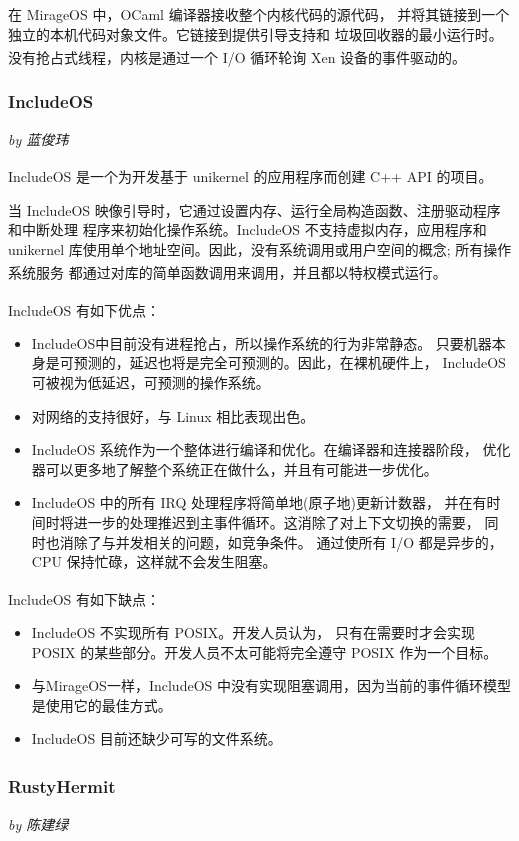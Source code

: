 \documentclass[UTF8,fontset=none,linespread=1.15]{ctexart}
\let\nosupcite\cite
\renewcommand*{\cite}[1]{\textsuperscript{\nosupcite{#1}}}
\newcommand{\sectionauthor}[1]{%
\vspace*{-5ex}
\noindent\textrm{\hfill\textit{by #1}}
\vspace*{2ex}\par}
\begin{document}
在 MirageOS 中，OCaml 编译器接收整个内核代码的源代码，
并将其链接到一个独立的本机代码对象文件。它链接到提供引导支持和
垃圾回收器的最小运行时。没有抢占式线程，内核是通过一个 I/O 循环轮询
Xen 设备的事件驱动的。\cite{bib:11-unikerel2}

\subsubsection{IncludeOS}\sectionauthor{蓝俊玮}

IncludeOS 是一个为开发基于 unikernel 的应用程序而创建 C++ API 的项目。\cite{bib:9-includeos}

当 IncludeOS 映像引导时，它通过设置内存、运行全局构造函数、注册驱动程序和中断处理
程序来初始化操作系统。IncludeOS 不支持虚拟内存，应用程序和
 unikernel 库使用单个地址空间。因此，没有系统调用或用户空间的概念; 所有操作系统服务
 都通过对库的简单函数调用来调用，并且都以特权模式运行。\cite{bib:10-includeos2}

\noindent IncludeOS 有如下优点：\cite{bib:9-includeos}
\begin{itemize}
\item IncludeOS中目前没有进程抢占，所以操作系统的行为非常静态。
只要机器本身是可预测的，延迟也将是完全可预测的。因此，在裸机硬件上，
IncludeOS可被视为低延迟，可预测的操作系统。
\item 对网络的支持很好，与 Linux 相比表现出色。
\item IncludeOS 系统作为一个整体进行编译和优化。在编译器和连接器阶段，
优化器可以更多地了解整个系统正在做什么，并且有可能进一步优化。
\item IncludeOS 中的所有 IRQ 处理程序将简单地(原子地)更新计数器，
并在有时间时将进一步的处理推迟到主事件循环。这消除了对上下文切换的需要，
同时也消除了与并发相关的问题，如竞争条件。
通过使所有 I/O 都是异步的，CPU 保持忙碌，这样就不会发生阻塞。
\end{itemize}

\noindent IncludeOS 有如下缺点：\cite{bib:9-includeos}
\begin{itemize}
\item IncludeOS 不实现所有 POSIX。开发人员认为，
只有在需要时才会实现 POSIX 的某些部分。开发人员不太可能将完全遵守 POSIX 作为一个目标。
\item 与MirageOS一样，IncludeOS 中没有实现阻塞调用，因为当前的事件循环模型是使用它的最佳方式。
\item IncludeOS 目前还缺少可写的文件系统。
\end{itemize}

\subsubsection[RustyHermit]{RustyHermit\cite{bib:14-rusty-hermit}\cite{bib:15-rust-runtime}\cite{bib:16-rust-runtime2}\cite{bib:17-rusty-hermit2}}\sectionauthor{陈建绿}
\end{document}
